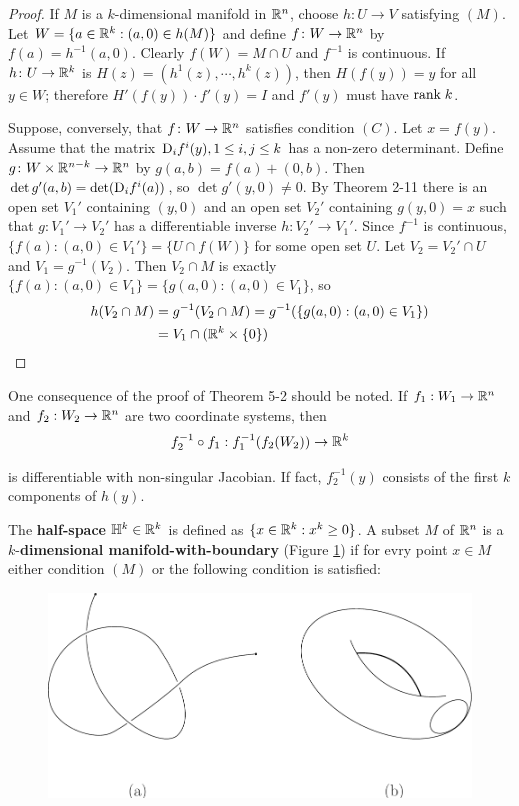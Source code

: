 \begin{proof}
    If $M$ is a $k$-dimensional manifold in $\mathbb{R}^n$, choose $h\colon{}U\to V$ satisfying $(M)$. Let 
    $W=\{a\in\mathbb{R}^k:(a,0)\in h(M)\}$ and define $f\colon{}W\to\mathbb{R}^n$ by $f(a)=h^{-1}(a,0)$. Clearly 
    $f(W)=M\cap U$ and $f^{-1}$ is continuous. If $h\colon{}U\to\mathbb{R}^k$ is $H(z)=(h^1(z),\cdots,h^k(z))$,
    then $H(f(y))=y$ for all $y\in W$; therefore $H'(f(y))\cdot f'(y)=I$ and $f'(y)$ must have 
    $\mathrm{rank}\; k$.

    Suppose, conversely, that $f\colon{}W\to\mathbb{R}^n$ satisfies condition $(C)$. Let $x=f(y)$. Assume that 
    the matrix $\mathrm{D}_if^i(y), 1\le i,j\le k$ has a non-zero determinant. Define $g\colon{}W\times \mathbb{R}^{n-k}\to\mathbb{R}^n$
    by $g(a,b)=f(a)+(0,b)$. Then $\det g'(a,b)=\det(\mathrm{D}_if^i(a))$, so $\det g'(y,0)\neq 0$. By Theorem 2-11
    there is an open set $V_1'$ containing $(y,0)$ and an open set $V_2'$ containing $g(y,0)=x$ such that
    $g\colon{}V_1'\to V_2'$ has a differentiable inverse $h\colon{}V_2'\to V_1'$. Since $f^{-1}$ is continuous, 
    $\{f(a):(a,0)\in V_1'\} = \{U\cap f(W)\}$ for some open set $U$. Let $V_2=V_2'\cap U$ and $V_1=g^{-1}(V_2)$.
    Then $V_2\cap M$ is exactly $\{f(a):(a,0)\in V_1\} = \{g(a,0):(a,0)\in V_1\}$, so 
    \begin{align*}
        h(V_2\cap M) 
        & = g^{-1}(V_2\cap M) 
          = g^{-1}(\{g(a,0):(a,0)\in V_1\}) \\
        & = V_1\cap (\mathbb{R}^k\times \{0\})
    \end{align*} 
\end{proof}

One consequence of the proof of Theorem 5-2 should be noted. If $f_1:W_1\to\mathbb{R}^n$ and 
$f_2:W_2\to \mathbb{R}^n$ are two coordinate systems, then 
\begin{align*}
    f_2^{-1}\circ f_1:f_1^{-1}(f_2(W_2))\to \mathbb{R}^k
\end{align*}

is differentiable with non-singular Jacobian. If fact, $f_2^{-1}(y)$ consists of the first
$k$ components of $h(y)$.

The \textbf{half-space} $\mathbb{H}^k\in\mathbb{R}^k$ is defined as $\{x\in\mathbb{R}^k:x^k\ge 0\}$. A subset 
$M$ of $\mathbb{R}^n$ is a $k$-\textbf{dimensional manifold-with-boundary} (Figure \ref{Fig 5-3}) if for evry point 
$x\in M$ either condition $(M)$ or the following condition is satisfied:

\begin{figure}[!htb]
    \centering
    \includegraphics[width=.75\linewidth]{./pics/Fig5-3.pdf}
    \caption{}
    \label{Fig 5-3}
\end{figure}

